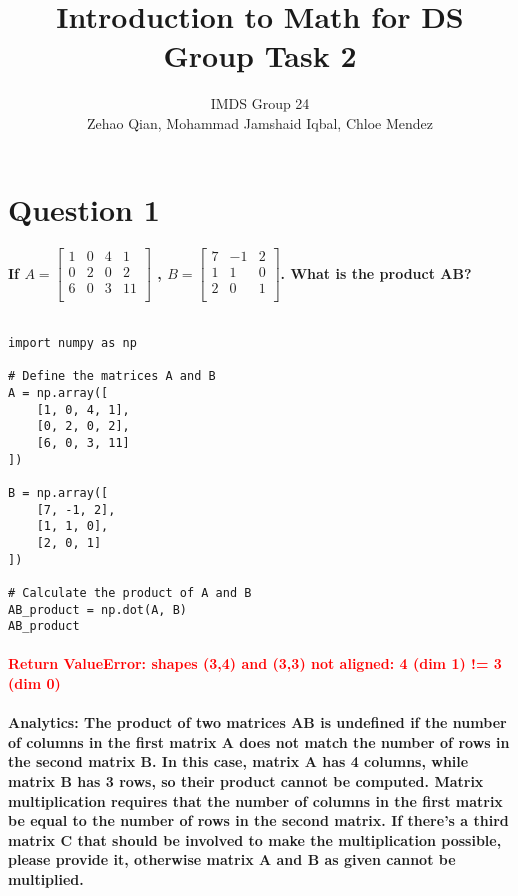 \documentclass[11pt]{article} %
\title{Introduction to Math for DS Group Task 2}
\author{IMDS Group 24 \\ Zehao Qian, Mohammad Jamshaid Iqbal, Chloe Mendez}
\begin{document}
\maketitle
% 
% 
% 
\section{Question 1}
% 
% 
% 
\paragraph{If \( A = \begin{bmatrix}
        1 & 0 & 4 & 1  \\
        0 & 2 & 0 & 2  \\
        6 & 0 & 3 & 11 \\
    \end{bmatrix} \)
    ,
    \( B = \begin{bmatrix}
        7 & -1 & 2 \\
        1 & 1  & 0 \\
        2 & 0  & 1 \\
    \end{bmatrix} \). What is the product AB?}
% 
% 
$$$$
% 
% 
\begin{lstlisting}[style=pystyle]
import numpy as np

# Define the matrices A and B
A = np.array([
    [1, 0, 4, 1],
    [0, 2, 0, 2],
    [6, 0, 3, 11]
])

B = np.array([
    [7, -1, 2],
    [1, 1, 0],
    [2, 0, 1]
])

# Calculate the product of A and B
AB_product = np.dot(A, B)
AB_product    
\end{lstlisting}
% 
% 
% 
% 
\paragraph{\textcolor{red}{Return ValueError: shapes (3,4) and (3,3) not aligned: 4 (dim 1) != 3 (dim 0)}}
% 
% 
\paragraph{\textbf{Analytics:} The product of two matrices AB is undefined if the number of columns in the first matrix A does not match the number of rows in the second matrix B. In this case, matrix A has 4 columns, while matrix B has 3 rows, so their product cannot be computed. Matrix multiplication requires that the number of columns in the first matrix be equal to the number of rows in the second matrix. If there's a third matrix C that should be involved to make the multiplication possible, please provide it, otherwise matrix A and B as given cannot be multiplied.}
% 
% 
% 
% 
% 
% 
% 
% 
% 
% 
% 
% 
% 
% 
\end{document}
